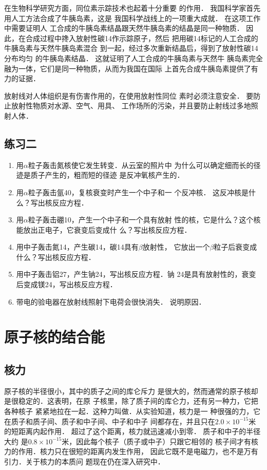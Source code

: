 在生物科学研究方面，同位素示踪技术也起着十分重要
的作用．
我国科学家首先用人工方法合成了牛胰岛素，这是
我国科学战线上的一项重大成就．
在这项工作中需要证明人
工合成的牛胰岛素结晶跟天然牛胰岛素的结晶是同一种物质．
因此，在合成过程中搀入放射性碳14作示踪原子，然后
把用碳14标记的人工合成的牛胰岛素与天然牛胰岛素混合
到一起，经过多次重新结晶后，得到了放射性碳14分布均匀
的牛胰岛素结晶．
这就证明了人工合成的牛胰岛素与天然牛
胰岛素完全融为一体，它们是同一种物质，从而为我国在国际
上首先合成牛胰岛素提供了有力的证据．

放射线对人体组织是有伤害作用的，在使用放射性同位
素时必须注意安全．
要防止放射性物质对水源、空气、用具、
工作场所的污染，并且要防止射线过多地照射人体．


\subsection*{练习二}

\begin{enumerate}
    \item 用$\alpha$粒子轰击氮核使它发生转变．从云室的照片中
    为什么可以确定细而长的径迹是质子产生的，粗而短的径迹
    是反冲氧核产生的．
    \item 用$\alpha$粒子轰击氩40，复核衰变时产生一个中子和一
    个反冲核．
    这反冲核是什么？写出核反应方程．
    \item 用$\alpha$粒子轰击硼10，产生一个中子和一个具有放射
    性的核，它是什么？这个核能放出正电子，它衰变后变成什
    么？写出核反应方程．
    \item 用中子轰击氮14，产生碳14，碳14具有$\beta$放射性，
    它放出一个$\beta$粒子后衰变成什么？写出核反应方程．
    \item 用中子轰击铝27，产生钠24，写出核反应方程．钠
    24是具有放射性的，衰变后变成镁24，写出核反应方程．
    \item 带电的验电器在放射线照射下电荷会很快消失．
    说明原因．
\end{enumerate}


\section{原子核的结合能}
\subsection{核力} 

原子核的半径很小，其中的质子之间的库仑斥力
是很大的，然而通常的原子核却是很稳定的．这表明，在原
子核里，除了质子间的库仑力，还有另一种力，它把各种核子
紧紧地拉在一起．这种力叫做．从实验知道，核力是一
种很强的力，它在质子和质子间、质子和中子间、中子和中子
间都存在，并且只在$2.0\times10^{-15}$米的短距离内起作用．
超过了这个距离，核力就迅速减小到零．
质子和中子的半径大约
是$0.8\times10^{-15}$米，因此每个核子（质子或中子）只跟它相邻的
核子间才有核力的作用．核力只在很短的距离内发生作用，
因此它既不是电磁力，也不是万有引力．关于核力的本质问
题现在仍在深入研究中．

